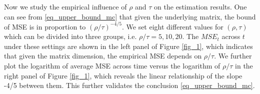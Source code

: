 \documentclass[12pt]{article}
\begin{document}

  Now we study the empirical influence of $\rho$ and $\tau$ on the estimation results. One can see from \eqref{eq_upper_bound_mc} that given the underlying matrix, the bound of MSE is in proportion to $(\rho/\tau)^{-4/5}$.
  We set eight different values for $(\rho,\tau)$ which can be divided into three groups, i.e. $\rho/\tau=5,10,20$. The $MSE_t$ across $t$ under these settings are shown in the left panel of Figure \ref{fig_1}, which indicates that given the matrix dimension, the empirical MSE depends on $\rho/\tau$.
  We further plot the logarithm of average MSE across time versus the logarithm of $\rho/\tau$ in the right panel of Figure \ref{fig_1}, which reveals the linear relationship of the slope -4/5 between them. This further validates the conclusion \eqref{eq_upper_bound_mc}.%
\end{document}
